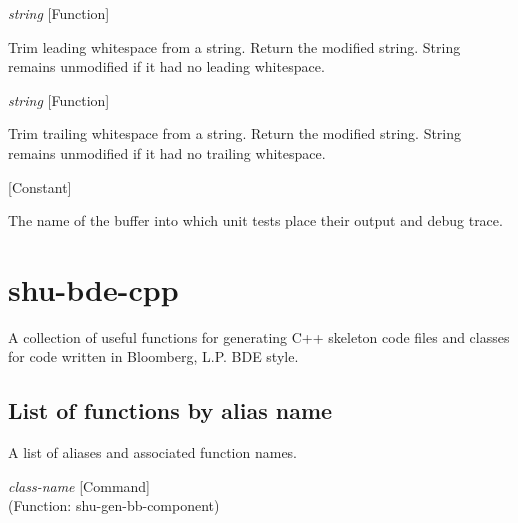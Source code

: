 \vspace{1em}
\noindent
{}
\usebox{\funcname}\emph{string}
 \hfill [Function]

\begin{doc-string}
Trim leading whitespace from a string.  Return the modified string.  String
remains unmodified if it had no leading whitespace.
\end{doc-string}

\vspace{1em}
\noindent
{}
\usebox{\funcname}\emph{string}
 \hfill [Function]

\begin{doc-string}
Trim trailing whitespace from a string.  Return the modified string.  String
remains unmodified if it had no trailing whitespace.
\end{doc-string}

\vspace{1em}
\noindent
{}
\usebox{\funcname}
 \hfill [Constant]

\begin{doc-string}
The name of the buffer into which unit tests place their output and debug trace.
\end{doc-string}

\eject
\section{shu-bde-cpp}


A collection of useful functions for generating C++ skeleton code files
and classes for code written in Bloomberg, L.P. BDE style.


\subsection{List of functions by alias name}

A list of aliases and associated function names.



\vspace{1em}
\noindent
{}
\usebox{\funcname}\emph{class-name}
 \hfill [Command]\\%
 (Function: shu-gen-bb-component)

